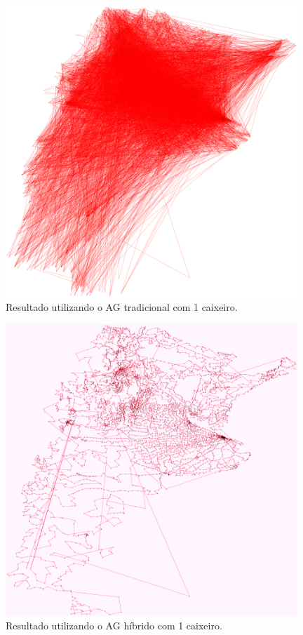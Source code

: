 \documentclass{abnt}
\begin{document}
	
		
		\begin{figure}[h]
				\centering
		        \includegraphics[width = 11cm,keepaspectratio]{img/output1}
		        \caption{Resultado utilizando o AG tradicional com 1 caixeiro.}
		        \label{tgat}
	   	\end{figure}
	   		
	   	\begin{figure}[h]
				\centering
		        \includegraphics[width = 11cm,keepaspectratio]{img/output1n}
		        \caption{Resultado utilizando o AG híbrido  com 1 caixeiro.}
		        \label{tgan}
	   	\end{figure}
	   	
\end{document}
